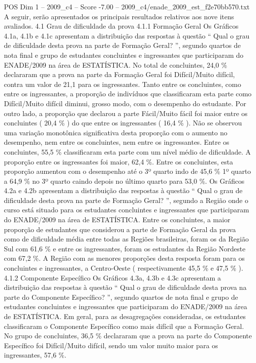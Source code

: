 \begin{textsample}{POS Dim 1 – 2009\_c4 – Score -7.00 – 2009\_c4/enade\_2009\_est\_f2e70bb570.txt}
A seguir, serão apresentados os principais resultados relativos aos nove itens avaliados. 4.1 Grau de dificuldade da prova 4.1.1 Formação Geral Os Gráficos 4.1a, 4.1b e 4.1c apresentam a distribuição das respostas à questão “ Qual o grau de dificuldade desta prova na parte de Formação Geral? ”, segundo quartos de nota final e grupo de estudantes concluintes e ingressantes que participaram do ENADE/2009 na área de ESTATÍSTICA.
No total de concluintes, 24,0 \% declararam que a prova na parte da Formação Geral foi Difícil/Muito difícil, contra um valor de 21,1 para os ingressantes.
Tanto entre os concluintes, como entre os ingressantes, a proporção de indivíduos que classificaram esta parte como Difícil/Muito difícil diminui, grosso modo, com o desempenho do estudante.
Por outro lado, a proporção que declarou a parte Fácil/Muito fácil foi maior entre os concluintes ( 20,4 \% ) do que entre os ingressantes ( 16,4 \% ).
Não se observou uma variação monotônica significativa desta proporção com o aumento no desempenho, nem entre os concluintes, nem entre os ingressantes.
Entre os concluintes, 55,5 \% classificaram esta parte com um nível médio de dificuldade.
A proporção entre os ingressantes foi maior, 62,4 \%.
Entre os concluintes, esta proporção aumentou com o desempenho até o 3º quarto indo de 45,6 \% 1º quarto a 64,9 \% no 3º quarto caindo depois no último quarto para 53,0 \%.
Os Gráficos 4.2a e 4.2b apresentam a distribuição das respostas à questão “ Qual o grau de dificuldade desta prova na parte de Formação Geral? ”, segundo a Região onde o curso está situado para os estudantes concluintes e ingressantes que participaram do ENADE/2009 na área de ESTATÍSTICA.
Entre os concluintes, a maior proporção de estudantes que considerou a parte de Formação Geral da prova como de dificuldade média entre todas as Regiões brasileiras, foram os da Região Sul com 61,6 \% e entre os ingressantes, foram os estudantes da Região Nordeste com 67,2 \%.
A Região com as menores proporções desta resposta foram para os concluintes e ingressantes, a Centro-Oeste ( respectivamente 45,5 \% e 47,5 \% ). 4.1.2 Componente Específico Os Gráficos 4.3a, 4.3b e 4.3c apresentam a distribuição das respostas à questão “ Qual o grau de dificuldade desta prova na parte do Componente Específico? ”, segundo quartos de nota final e grupo de estudantes concluintes e ingressantes que participaram do ENADE/2009 na área de ESTATÍSTICA.
Em geral, para as desagregações consideradas, os estudantes classificaram o Componente Específico como mais difícil que a Formação Geral.
No grupo de concluintes, 36,5 \% declararam que a prova na parte do Componente Específico foi Difícil/Muito difícil, sendo um valor muito maior para os ingressantes, 57,6 \%.

\end{textsample}
